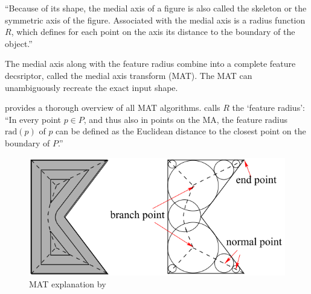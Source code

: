 ``Because of its shape, the medial axis of a figure is also called the skeleton or the symmetric axis of the figure.
Associated with the medial axis is a radius function $R$, which defines for each point on the axis its distance to the boundary of the object.''
\cite{lee1982medial}

The medial axis along with the feature radius combine into a complete feature decsriptor, called the medial axis transform (MAT).
The MAT can unambiguously recreate the exact input shape. 

\cite{Moesen2011} provides a thorough overview of all MAT algorithms.
\cite{Moesen2011} calls $R$ the `feature radius': ``In every point $p \in P$, and thus also in points on the MA, the feature radius $\text{rad}(p)$ of $p$ can be defined as the Euclidean distance to the closest point on the boundary of $P$.''


\begin{figure}
\centering
\includegraphics[width=.9\columnwidth]{sources/intro/medial_axis_Kao.png}
\caption{MAT explanation by \citeauthor{kao1998optimal}}
\label{MAT_explanation}
\end{figure}



